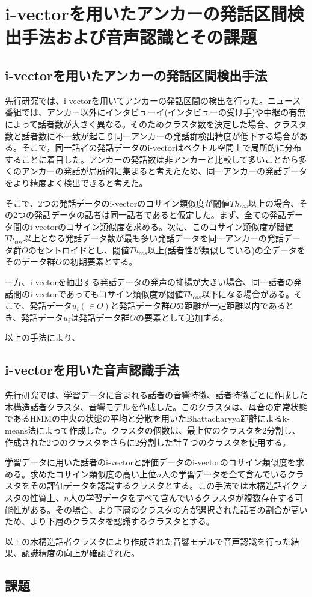 \chapter{i-vectorを用いたアンカーの発話区間検出手法および音声認識とその課題}

\section{i-vectorを用いたアンカーの発話区間検出手法}
\label{section:clustering}
先行研究\cite{nozaki_gakuseikai}では、i-vectorを用いてアンカーの発話区間の検出を行った。ニュース番組では、アンカー以外にインタビューイ(インタビューの受け手)や中継の有無によって話者数が大きく異なる。そのためクラスタ数を決定した場合、クラスタ数と話者数に不一致が起こり同一アンカーの発話群検出精度が低下する場合がある。そこで，同一話者の発話データのi-vectorはベクトル空間上で局所的に分布することに着目した。アンカーの発話数は非アンカーと比較して多いことから多くのアンカーの発話が局所的に集まると考えたため、同一アンカーの発話データをより精度よく検出できると考えた。\par
そこで、2つの発話データのi-vectorのコサイン類似度が閾値$Th_{cos}$以上の場合、その2つの発話データの話者は同一話者であると仮定した。まず、全ての発話データ間のi-vectorのコサイン類似度を求める。次に、このコサイン類似度が閾値$Th_{cos}$以上となる発話データ数が最も多い発話データを同一アンカーの発話データ群$O$のセントロイドとし、閾値$Th_{cos}$以上(話者性が類似している)の全データをそのデータ群$O$の初期要素とする。\par
一方、i-vectorを抽出する発話データの発声の抑揚が大きい場合、同一話者の発話間のi-vectorであってもコサイン類似度が閾値$Th_{cos}$以下になる場合がある。そこで、発話データ$u_i(\in O)$と発話データ群$O$の距離が一定距離以内であるとき、発話データ$u_i$は発話データ群$O$の要素として追加する。\par
以上の手法により、

\section{i-vectorを用いた音声認識手法}
先行研究\cite{yoshimura_clustering}では、学習データに含まれる話者の音響特徴、話者特徴ごとに作成した木構造話者クラスタ、音響モデルを作成した。このクラスタは、母音の定常状態であるHMMの中央の状態の平均と分散を用いたBhattacharyya距離によるk-means法によって作成した。クラスタの個数は、最上位のクラスタを2分割し、作成された2つのクラスタをさらに2分割した計７つのクラスタを使用する。\par
学習データに用いた話者のi-vectorと評価データのi-vectorのコサイン類似度を求める。求めたコサイン類似度の高い上位$n$人の学習データを全て含んでいるクラスタをその評価データを認識するクラスタとする。この手法では木構造話者クラスタの性質上、$n$人の学習データをすべて含んでいるクラスタが複数存在する可能性がある。その場合、より下層のクラスタの方が選択された話者の割合が高いため、より下層のクラスタを認識するクラスタとする。\par
以上の木構造話者クラスタにより作成された音響モデルで音声認識を行った結果、認識精度の向上が確認された。

\label{section:yoshimura_pre_clustering}
\section{課題}

